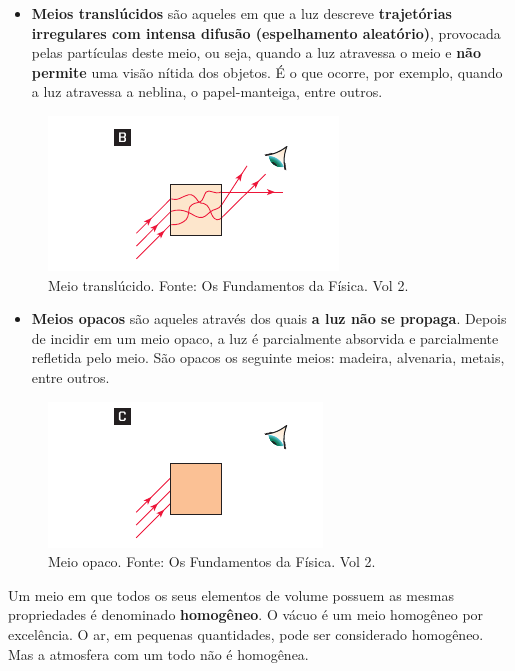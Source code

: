 \documentclass[11pt,twocolumn,oneside]{article}
\begin{document}
\begin{itemize}

\item \textbf{Meios translúcidos} são aqueles em que a luz descreve \textbf{trajetórias irregulares com intensa difusão (espelhamento aleatório)}, provocada pelas partículas deste meio, ou seja, quando a luz atravessa o meio e \textbf{não permite} uma visão nítida dos objetos. É o que ocorre, por exemplo, quando a luz atravessa a neblina, o papel-manteiga, entre outros.

\end{itemize}


\begin{figure}[h]{}
\centering\includegraphics[width=2.5truein]{img5.png}
\caption{Meio translúcido. Fonte: Os Fundamentos da Física. Vol 2.}
\centering
\end{figure}

\begin{itemize}

\item \textbf{Meios opacos} são aqueles através dos quais \textbf{a luz não se propaga}. Depois de incidir em um meio opaco, a luz é parcialmente absorvida e parcialmente refletida pelo meio. São opacos os seguinte meios: madeira, alvenaria, metais, entre outros.

\end{itemize}


\begin{figure}[h]{}
\centering\includegraphics[width=2.5truein]{img6.png}
\caption{Meio opaco. Fonte: Os Fundamentos da Física. Vol 2.}
\centering
\end{figure}

Um meio em que todos os seus elementos de volume possuem as mesmas propriedades é denominado \textbf{homogêneo}. O vácuo é um meio homogêneo por excelência. O ar, em pequenas quantidades, pode ser considerado homogêneo. Mas a atmosfera com um todo não é homogênea.
\end{document}
